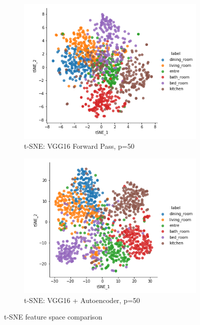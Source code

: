\begin{figure}[H]
    \centering
    \begin{subfigure}[b]{0.45\textwidth}
      \includegraphics[width=\textwidth]{pictures/plots/tsne_vgg16}
      \caption{t-SNE: VGG16 Forward Pass, p=50}
      \label{fig:tsne1}
    \end{subfigure}
    \begin{subfigure}[b]{0.45\textwidth}
      \includegraphics[width=\textwidth]{pictures/plots/tsne_vgg16_dae}
      \caption{t-SNE: VGG16 + Autoencoder,  p=50}
      \label{fig:tsne2}
    \end{subfigure}
    \caption{t-SNE feature space comparison}
    \label{fig:tsne}
\end{figure}



